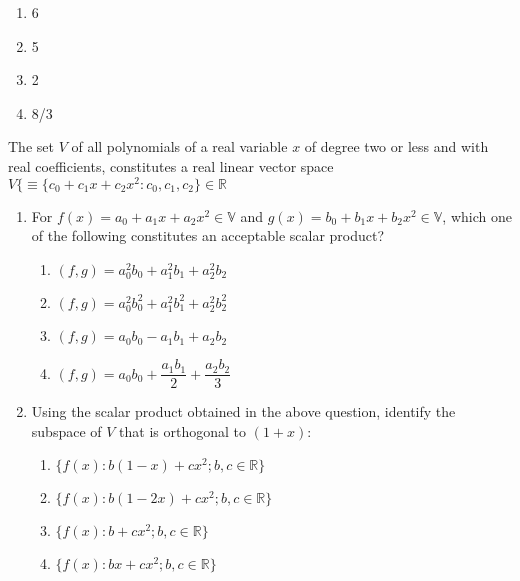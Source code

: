 \hfill{}
\begin{multicols}{4}
    \begin{enumerate}
        \item 6
        \item 5
        \item 2
        \item 8/3
    \end{enumerate}
\end{multicols}
\item 
The set $V$ of all polynomials of a real variable $x$ of degree two or less and with real coefficients, constitutes a real linear vector space $V \{\equiv \{ c_{0} + c_{1}x + c_{2}x^{2} : c_{0}, c_{1}, c_{2}\} \in \mathbb{R}$ 
\hfill{}
\begin{enumerate}
\item For $f(x)=a_0 + a_1x + a_2 x^2 \in\mathbb{V}$ and $g(x) = b_0 + b_1 x + b_2  x^2 \in\mathbb{V} $, which one of the following constitutes an acceptable scalar product?
\begin{multicols}{2}
	\begin{enumerate}[itemsep=1ex]
    \item $(f,g)=a_0^2 b_0 + a_1^2 b_1 + a_2^2 b_2$
    \item $(f,g)=a_0^2 b_0^2 + a_1^2 b_1^2 + a_2^2 b_2^2$
    \item $(f,g)=a_0 b_0 - a_1 b_1 + a_2 b_2$
    \item $(f,g)=a_0 b_0 + \dfrac{a_1 b_1}{2} + \dfrac{a_2 b_2}{3}$
\end{enumerate}
\end{multicols}

\item Using the scalar product obtained in the above question, identify the subspace of $V$ that is orthogonal to $(1 + x)$:
\begin{multicols}{2}
\begin{enumerate}
    \item $\{f(x): b(1-x)+c x^2 ; b,c\in\mathbb{R}\}$
    \item $\{f(x): b(1-2x)+c x^2 ; b,c\in\mathbb{R}\}$
    \item $\{f(x):b + c x^2 ; b,c\in\mathbb{R}\}$
    \item $\{f(x): b x + c x^2 ; b,c\in\mathbb{R}\}$
\end{enumerate}
\end{multicols}
\end{enumerate}

